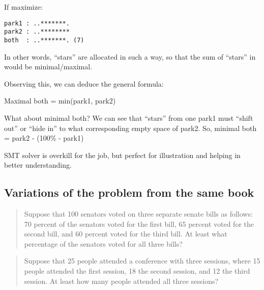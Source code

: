 If maximize:

\begin{lstlisting}
park1 : ..*******.
park2 : ..********
both  : ..*******. (7)
\end{lstlisting}

In other words, ``stars'' are allocated in such a way, so that the sum of ``stars'' in  would be minimal/maximal.

Observing this, we can deduce the general formula:

Maximal both = min(park1, park2)

What about minimal both?
We can see that ``stars'' from one park1 must ``shift out'' or ``hide in'' to what corresponding empty space of park2.
So, minimal both = park2 - (100\% - park1)

SMT solver is overkill for the job, but perfect for illustration and helping in better understanding.

\subsection{Variations of the problem from the same book}

\begin{framed}
\begin{quotation}

Suppose that 100 senators voted on three separate senate bills as follows:
70 percent of the senators voted for the first bill, 65 percent voted for the second bill,
and 60 percent voted for the third bill. At least what percentage of the senators voted for all three bills?

\end{quotation}
\end{framed}

\begin{framed}
\begin{quotation}

Suppose that 25 people attended a conference with three sessions, where 15 people attended the first session, 
18 the second session, and 12 the third session. At least how many people attended all three sessions?

\end{quotation}
\end{framed}

